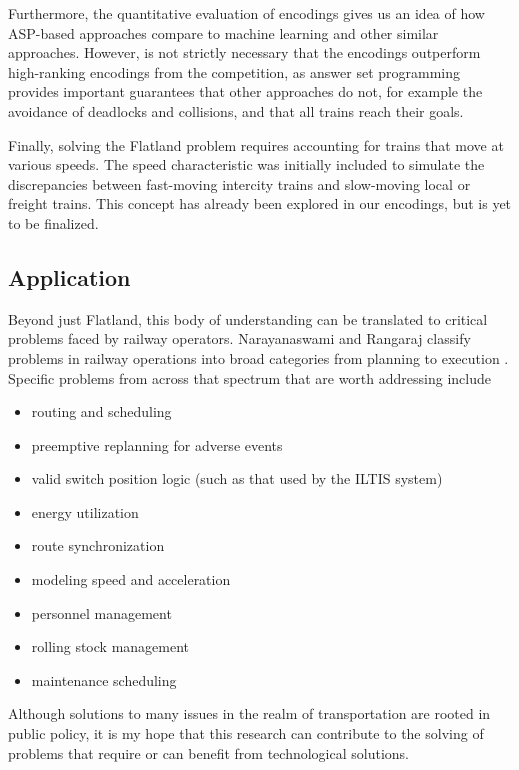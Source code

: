 Furthermore, the quantitative evaluation of encodings
gives us an idea of how ASP-based approaches compare to machine learning
and other similar approaches.
However, is not strictly necessary that the encodings outperform high-ranking
encodings from the competition,
as answer set programming provides important guarantees that other approaches do not,
for example the avoidance of deadlocks and collisions,
and that all trains reach their goals.

Finally, solving the Flatland problem requires
accounting for trains that move at various speeds.
The speed characteristic was initially included to simulate the discrepancies between
fast-moving intercity trains and slow-moving local or freight trains.
This concept has already been explored in our encodings,
but is yet to be finalized.

\subsection{Application}
Beyond just Flatland, this body of understanding can be translated to critical problems faced by railway operators.
Narayanaswami and Rangaraj classify problems in railway operations into broad categories from planning to execution \cite{narran2011a}.
Specific problems from across that spectrum that are worth addressing include
\begin{itemize}
	\item routing and scheduling
	\item preemptive replanning for adverse events
	\item valid switch position logic (such as that used by the ILTIS system)
	\item energy utilization
	\item route synchronization
	\item modeling speed and acceleration
	\item personnel management
	\item rolling stock management
	\item maintenance scheduling
\end{itemize}
Although solutions to many issues in the realm of transportation are rooted in public policy,
it is my hope that this research can contribute to the solving of problems that require or can benefit from technological solutions.

%
